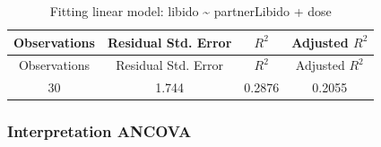 \documentclass[]{article}
\begin{document}
\begin{longtable}[]{@{}cccc@{}}
\caption{Fitting linear model: libido \textasciitilde{} partnerLibido +
dose}\tabularnewline
\toprule
\begin{minipage}[b]{0.18\columnwidth}\centering\strut
Observations\strut
\end{minipage} & \begin{minipage}[b]{0.27\columnwidth}\centering\strut
Residual Std. Error\strut
\end{minipage} & \begin{minipage}[b]{0.11\columnwidth}\centering\strut
\(R^2\)\strut
\end{minipage} & \begin{minipage}[b]{0.20\columnwidth}\centering\strut
Adjusted \(R^2\)\strut
\end{minipage}\tabularnewline
\midrule
\endfirsthead
\toprule
\begin{minipage}[b]{0.18\columnwidth}\centering\strut
Observations\strut
\end{minipage} & \begin{minipage}[b]{0.27\columnwidth}\centering\strut
Residual Std. Error\strut
\end{minipage} & \begin{minipage}[b]{0.11\columnwidth}\centering\strut
\(R^2\)\strut
\end{minipage} & \begin{minipage}[b]{0.20\columnwidth}\centering\strut
Adjusted \(R^2\)\strut
\end{minipage}\tabularnewline
\midrule
\endhead
\begin{minipage}[t]{0.18\columnwidth}\centering\strut
30\strut
\end{minipage} & \begin{minipage}[t]{0.27\columnwidth}\centering\strut
1.744\strut
\end{minipage} & \begin{minipage}[t]{0.11\columnwidth}\centering\strut
0.2876\strut
\end{minipage} & \begin{minipage}[t]{0.20\columnwidth}\centering\strut
0.2055\strut
\end{minipage}\tabularnewline
\bottomrule
\end{longtable}

\subsubsection*{Interpretation ANCOVA}\label{interpretation-ancova}
\end{document}
